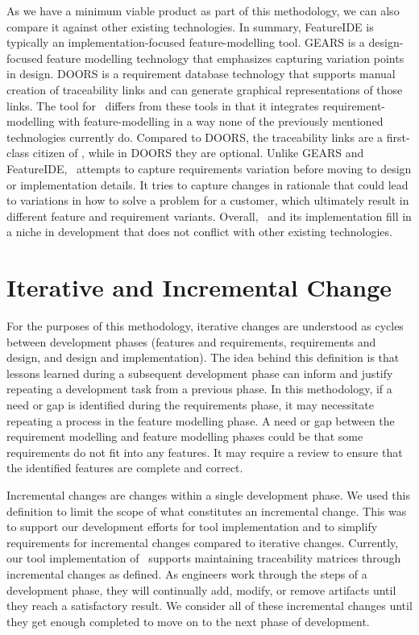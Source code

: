 As we have a minimum viable product as part of this methodology, we can also compare it against other existing technologies. In summary, FeatureIDE is typically an implementation-focused feature-modelling tool. GEARS is a design-focused feature modelling technology that emphasizes capturing variation points in design. DOORS is a requirement database technology that supports manual creation of traceability links and can generate graphical representations of those links. The tool for \tool\ differs from these tools in that it integrates requirement-modelling with feature-modelling in a way none of the previously mentioned technologies currently do. Compared to DOORS, the traceability links are a first-class citizen of \tool, while in DOORS they are optional. Unlike GEARS and FeatureIDE, \tool\ attempts to capture requirements variation before moving to design or implementation details. It tries to capture changes in rationale that could lead to variations in how to solve a problem for a customer, which ultimately result in different feature and requirement variants. Overall, \tool\ and its implementation fill in a niche in development that does not conflict with other existing technologies. 

\section{Iterative and Incremental Change}
\label{sec:Iterative_Incremental}

For the purposes of this methodology, iterative changes are understood as cycles between development phases (features and requirements, requirements and design, and design and implementation). The idea behind this definition is that lessons learned during a subsequent development phase can inform and justify repeating a development task from a previous phase. In this methodology, if a need or gap is identified during the requirements phase, it may necessitate repeating a process in the feature modelling phase. A need or gap between the requirement modelling and feature modelling phases could be that some requirements do not fit into any features. It may require a review to ensure that the identified features are complete and correct. 

Incremental changes are changes within a single development phase. We used this definition to limit the scope of what constitutes an incremental change. This was to support our development efforts for tool implementation and to simplify requirements for incremental changes compared to iterative changes. Currently, our tool implementation of \tool\ supports maintaining traceability matrices through incremental changes as defined. As engineers work through the steps of a development phase, they will continually add, modify, or remove artifacts until they reach a satisfactory result. We consider all of these incremental changes until they get enough completed to move on to the next phase of development.

